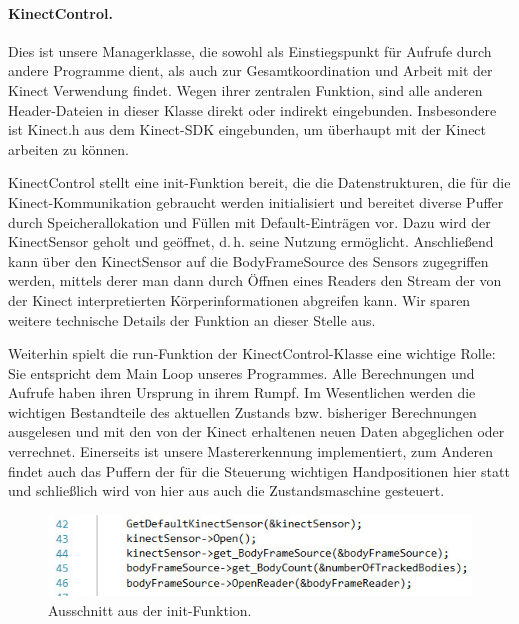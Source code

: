 	\paragraph{KinectControl.} Dies ist unsere Managerklasse, die sowohl als Einstiegspunkt für Aufrufe durch andere Programme dient, als auch zur Gesamtkoordination und Arbeit mit der Kinect Verwendung findet. Wegen ihrer zentralen Funktion, sind alle anderen Header-Dateien in dieser Klasse direkt oder indirekt eingebunden. Insbesondere ist Kinect.h aus dem Kinect-SDK eingebunden, um überhaupt mit der Kinect arbeiten zu können.\par 
	KinectControl stellt eine init-Funktion bereit, die die Datenstrukturen, die für die Kinect-Kommunikation gebraucht werden initialisiert und bereitet diverse Puffer durch Speicherallokation und Füllen mit Default-Einträgen vor. Dazu wird der KinectSensor geholt und \glqq geöffnet\grqq{}, d.\,h. seine Nutzung ermöglicht. Anschließend kann über den KinectSensor auf die BodyFrameSource des Sensors zugegriffen werden, mittels derer man dann durch Öffnen eines Readers den Stream der von der Kinect interpretierten Körperinformationen abgreifen kann. Wir sparen weitere technische Details der Funktion an dieser Stelle aus.\par\smallskip
	Weiterhin spielt die run-Funktion der KinectControl-Klasse eine wichtige Rolle: Sie entspricht dem \glqq Main Loop\grqq{} unseres Programmes. Alle Berechnungen und Aufrufe haben ihren Ursprung in ihrem Rumpf. Im Wesentlichen werden die wichtigen Bestandteile des aktuellen Zustands bzw. bisheriger Berechnungen ausgelesen und mit den von der Kinect erhaltenen neuen Daten abgeglichen oder verrechnet. Einerseits ist unsere Mastererkennung implementiert, zum Anderen findet auch das Puffern der für die Steuerung wichtigen Handpositionen hier statt und schließlich wird von hier aus auch die Zustandsmaschine gesteuert.\par
	\begin{figure}[h]
	\centering
	\includegraphics[scale=.5]{pictures/kinectinit.jpg}
	\caption{Ausschnitt aus der init-Funktion.}
	\end{figure}
	\par\medskip
